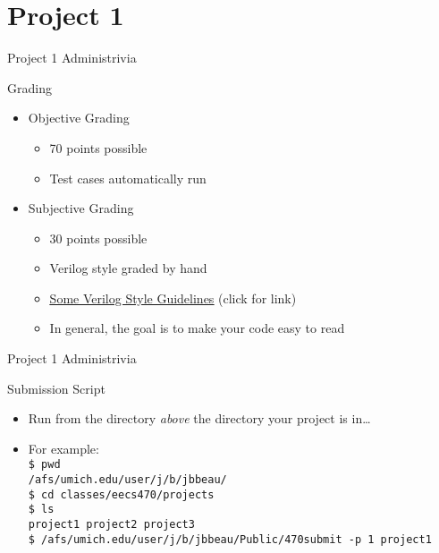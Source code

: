 \documentclass[table,dvipsnames,colorlinks=true]{beamer}
\begin{document}
\section{Project 1}
\begin{frame}{Project 1 Administrivia}
    \begin{block}{Grading}
        \begin{itemize}
            \item Objective Grading
                \begin{itemize}
                    \item 70 points possible
                    \item Test cases automatically run
                \end{itemize}
            \item Subjective Grading
                \begin{itemize}
                    \item 30 points possible
                    \item Verilog style graded by hand
                    \item \href{https://www.eecs.umich.edu/courses/eecs470/projects/guidelines.pdf}{\underline{Some Verilog Style Guidelines}} (click for link)
                    \item In general, the goal is to make your code easy to read
                \end{itemize}
        \end{itemize}
    \end{block}
\end{frame}

\begin{frame}{Project 1 Administrivia}
    \begin{block}{Submission Script}
        \begin{itemize}
            \item Run from the directory \emph{above} the directory your project
                is in\dots
            \item For example: \\
                \texttt{\$ pwd} \\
                \texttt{/afs/umich.edu/user/j/b/jbbeau/} \\
                \texttt{\$ cd classes/eecs470/projects} \\
                \texttt{\$ ls} \\
                \texttt{project1 project2 project3} \\
                \texttt{\$ /afs/umich.edu/user/j/b/jbbeau/Public/470submit -p 1
                project1} 
        \end{itemize}
    \end{block}
\end{frame}
\end{document}
